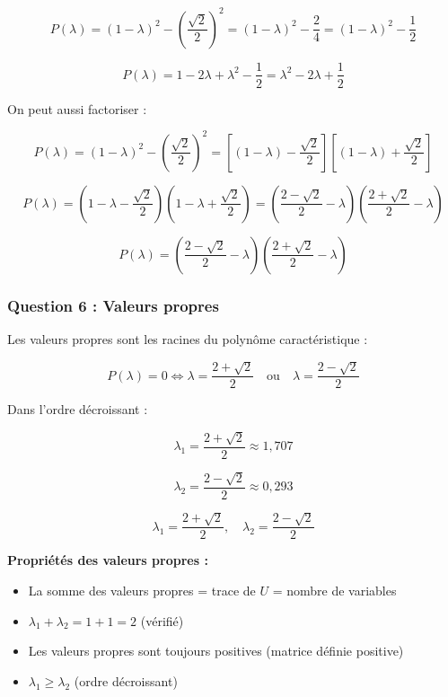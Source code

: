 \documentclass[11pt,a4paper]{article}
\begin{document}
$$P(\lambda) = (1 - \lambda)^2 - \left(\frac{\sqrt{2}}{2}\right)^2 = (1 - \lambda)^2 - \frac{2}{4} = (1 - \lambda)^2 - \frac{1}{2}$$

$$P(\lambda) = 1 - 2\lambda + \lambda^2 - \frac{1}{2} = \lambda^2 - 2\lambda + \frac{1}{2}$$

On peut aussi factoriser :

$$P(\lambda) = (1 - \lambda)^2 - \left(\frac{\sqrt{2}}{2}\right)^2 = \left[(1 - \lambda) - \frac{\sqrt{2}}{2}\right]\left[(1 - \lambda) + \frac{\sqrt{2}}{2}\right]$$

$$P(\lambda) = \left(1 - \lambda - \frac{\sqrt{2}}{2}\right)\left(1 - \lambda + \frac{\sqrt{2}}{2}\right) = \left(\frac{2 - \sqrt{2}}{2} - \lambda\right)\left(\frac{2 + \sqrt{2}}{2} - \lambda\right)$$

$$\boxed{P(\lambda) = \left(\frac{2 - \sqrt{2}}{2} - \lambda\right)\left(\frac{2 + \sqrt{2}}{2} - \lambda\right)}$$

\subsubsection{Question 6 : Valeurs propres}

Les valeurs propres sont les racines du polynôme caractéristique :

$$P(\lambda) = 0 \Leftrightarrow \lambda = \frac{2 + \sqrt{2}}{2} \quad \text{ou} \quad \lambda = \frac{2 - \sqrt{2}}{2}$$

Dans l'ordre décroissant :

$$\lambda_1 = \frac{2 + \sqrt{2}}{2} \approx 1,707$$

$$\lambda_2 = \frac{2 - \sqrt{2}}{2} \approx 0,293$$

$$\boxed{\lambda_1 = \frac{2 + \sqrt{2}}{2}, \quad \lambda_2 = \frac{2 - \sqrt{2}}{2}}$$

\begin{astucebox}
\textbf{Propriétés des valeurs propres :}
\begin{itemize}
    \item La somme des valeurs propres = trace de $U$ = nombre de variables
    \item $\lambda_1 + \lambda_2 = 1 + 1 = 2$ (vérifié)
    \item Les valeurs propres sont toujours positives (matrice définie positive)
    \item $\lambda_1 \geq \lambda_2$ (ordre décroissant)
\end{itemize}
\end{astucebox}
\end{document}
